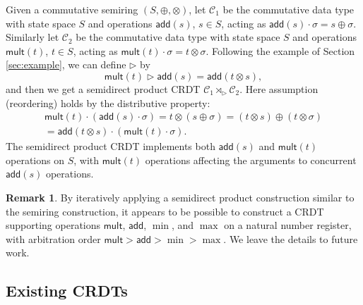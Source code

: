 \documentclass[acmsmall,nonacm,12pt]{acmart}
\newcommand{\mc}[1]{\ensuremath{\mathcal{#1}}}
\newcommand{\msf}[1]{\ensuremath{\mathsf{#1}}}
\newcommand{\act}{\triangleright}
\theoremstyle{plain}
\theoremstyle{definition}
\newtheorem{myrmk}[mythm]{Remark}
\begin{document}
Given a commutative semiring $(S, \oplus, \otimes)$, let $\mc{C}_1$ be the commutative data type with state space $S$ and operations $\msf{add}(s)$, $s \in S$, acting as $\msf{add}(s) \cdot \sigma = s \oplus \sigma$.  Similarly let $\mc{C}_2$ be the commutative data type with state space $S$ and operations $\msf{mult}(t)$, $t \in S$, acting as $\msf{mult}(t) \cdot \sigma = t \otimes \sigma$.  Following the example of Section \ref{sec:example}, we can define $\act$ by
\[
\msf{mult}(t) \act \msf{add}(s) = \msf{add}(t \otimes s),
\]
and then we get a semidirect product CRDT $\mc{C}_1 \rtimes_\act \mc{C}_2$.  Here assumption (reordering) holds by the distributive property:
\begin{align*}
\msf{mult}(t) \cdot (\msf{add}(s) \cdot \sigma) = t \otimes (s \oplus \sigma) = (t \otimes s) \oplus (t \otimes \sigma) \\ = \msf{add}(t \otimes s) \cdot (\msf{mult}(t) \cdot \sigma).
\end{align*}
The semidirect product CRDT implements both $\msf{add}(s)$ and $\msf{mult}(t)$ operations on $S$, with $\msf{mult}(t)$ operations affecting the arguments to concurrent $\msf{add}(s)$ operations.

\begin{myrmk}
By iteratively applying a semidirect product construction similar to the semiring construction, it appears to be possible to construct a CRDT supporting operations $\msf{mult}$, $\msf{add}$, $\min$, and $\max$ on a natural number register, with arbitration order $\msf{mult} > \msf{add} > \min > \max$.  We leave the details to future work.
\end{myrmk}



\subsection{Existing CRDTs}
\end{document}
